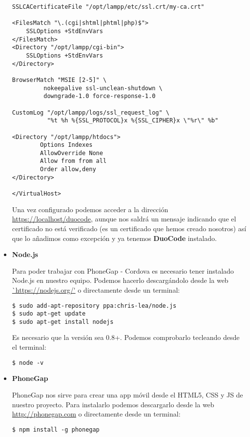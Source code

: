\begin{itemize}
{\begin{verbatim}
SSLCACertificateFile "/opt/lampp/etc/ssl.crt/my-ca.crt"

<FilesMatch "\.(cgi|shtml|phtml|php)$">
    SSLOptions +StdEnvVars
</FilesMatch>
<Directory "/opt/lampp/cgi-bin">
    SSLOptions +StdEnvVars
</Directory>

BrowserMatch "MSIE [2-5]" \
         nokeepalive ssl-unclean-shutdown \
         downgrade-1.0 force-response-1.0

CustomLog "/opt/lampp/logs/ssl_request_log" \
          "%t %h %{SSL_PROTOCOL}x %{SSL_CIPHER}x \"%r\" %b"

<Directory "/opt/lampp/htdocs">
        Options Indexes
        AllowOverride None
        Allow from from all
        Order allow,deny
</Directory>

</VirtualHost>
\end{verbatim}
}

Una vez configurado podemos acceder a la dirección \url{https://localhost/duocode}, aunque nos saldrá un mensaje indicando que el certificado no está verificado (es un certificado que hemos creado nosotros) así que lo añadimos como excepción y ya tenemos \textbf{DuoCode} instalado.


\item \textbf{Node.js}

Para poder trabajar con PhoneGap - Cordova es necesario tener instalado Node.js en nuestro equipo. Podemos hacerlo descargándolo desde la web \url{`https://nodejs.org/'} o directamente desde un terminal:

{\codesize
\begin{verbatim}
$ sudo add-apt-repository ppa:chris-lea/node.js
$ sudo apt-get update
$ sudo apt-get install nodejs
\end{verbatim}
}

Es necesario que la versión sea 0.8+. Podemos comprobarlo tecleando desde el terminal: 

{\codesize
\begin{verbatim}
$ node -v
\end{verbatim}
}

\item \textbf{PhoneGap}

PhoneGap nos sirve para crear una app móvil desde el HTML5, CSS y JS de nuestro proyecto. Para instalarlo podemos descargarlo desde la web \url{http://phonegap.com} o directamente desde un terminal:

{\codesize
\begin{verbatim}
$ npm install -g phonegap
\end{verbatim}
}


\end{itemize}
